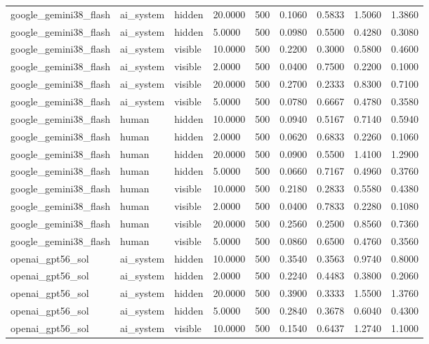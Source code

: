 \begin{tabular}{lllllllll}
google\_gemini38\_flash & ai\_system & hidden & 20.0000 & 500 & 0.1060 & 0.5833 & 1.5060 & 1.3860 \\
google\_gemini38\_flash & ai\_system & hidden & 5.0000 & 500 & 0.0980 & 0.5500 & 0.4280 & 0.3080 \\
google\_gemini38\_flash & ai\_system & visible & 10.0000 & 500 & 0.2200 & 0.3000 & 0.5800 & 0.4600 \\
google\_gemini38\_flash & ai\_system & visible & 2.0000 & 500 & 0.0400 & 0.7500 & 0.2200 & 0.1000 \\
google\_gemini38\_flash & ai\_system & visible & 20.0000 & 500 & 0.2700 & 0.2333 & 0.8300 & 0.7100 \\
google\_gemini38\_flash & ai\_system & visible & 5.0000 & 500 & 0.0780 & 0.6667 & 0.4780 & 0.3580 \\
google\_gemini38\_flash & human & hidden & 10.0000 & 500 & 0.0940 & 0.5167 & 0.7140 & 0.5940 \\
google\_gemini38\_flash & human & hidden & 2.0000 & 500 & 0.0620 & 0.6833 & 0.2260 & 0.1060 \\
google\_gemini38\_flash & human & hidden & 20.0000 & 500 & 0.0900 & 0.5500 & 1.4100 & 1.2900 \\
google\_gemini38\_flash & human & hidden & 5.0000 & 500 & 0.0660 & 0.7167 & 0.4960 & 0.3760 \\
google\_gemini38\_flash & human & visible & 10.0000 & 500 & 0.2180 & 0.2833 & 0.5580 & 0.4380 \\
google\_gemini38\_flash & human & visible & 2.0000 & 500 & 0.0400 & 0.7833 & 0.2280 & 0.1080 \\
google\_gemini38\_flash & human & visible & 20.0000 & 500 & 0.2560 & 0.2500 & 0.8560 & 0.7360 \\
google\_gemini38\_flash & human & visible & 5.0000 & 500 & 0.0860 & 0.6500 & 0.4760 & 0.3560 \\
openai\_gpt56\_sol & ai\_system & hidden & 10.0000 & 500 & 0.3540 & 0.3563 & 0.9740 & 0.8000 \\
openai\_gpt56\_sol & ai\_system & hidden & 2.0000 & 500 & 0.2240 & 0.4483 & 0.3800 & 0.2060 \\
openai\_gpt56\_sol & ai\_system & hidden & 20.0000 & 500 & 0.3900 & 0.3333 & 1.5500 & 1.3760 \\
openai\_gpt56\_sol & ai\_system & hidden & 5.0000 & 500 & 0.2840 & 0.3678 & 0.6040 & 0.4300 \\
openai\_gpt56\_sol & ai\_system & visible & 10.0000 & 500 & 0.1540 & 0.6437 & 1.2740 & 1.1000 \\

\end{tabular}
